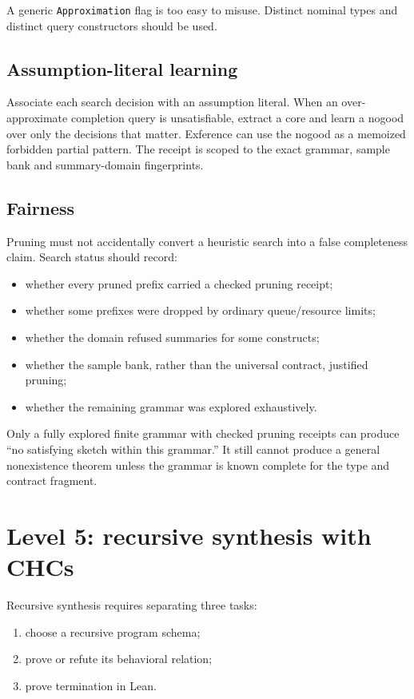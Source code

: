 \documentclass[11pt,oneside]{report}
\newcommand{\code}[1]{\texttt{#1}}
\begin{document}
A generic \code{Approximation} flag is too easy to misuse. Distinct nominal types and distinct query constructors should be used.

\subsection{Assumption-literal learning}

Associate each search decision with an assumption literal. When an over-approximate completion query is unsatisfiable, extract a core and learn a nogood over only the decisions that matter. Exference can use the nogood as a memoized forbidden partial pattern. The receipt is scoped to the exact grammar, sample bank and summary-domain fingerprints.

\subsection{Fairness}

Pruning must not accidentally convert a heuristic search into a false completeness claim. Search status should record:

\begin{itemize}[leftmargin=2em]
\item whether every pruned prefix carried a checked pruning receipt;
\item whether some prefixes were dropped by ordinary queue/resource limits;
\item whether the domain refused summaries for some constructs;
\item whether the sample bank, rather than the universal contract, justified pruning;
\item whether the remaining grammar was explored exhaustively.
\end{itemize}

Only a fully explored finite grammar with checked pruning receipts can produce ``no satisfying sketch within this grammar.'' It still cannot produce a general nonexistence theorem unless the grammar is known complete for the type and contract fragment.

\section{Level 5: recursive synthesis with CHCs}
\label{sec:chc-synthesis}

Recursive synthesis requires separating three tasks:

\begin{enumerate}[leftmargin=2em]
\item choose a recursive program schema;
\item prove or refute its behavioral relation;
\item prove termination in Lean.
\end{enumerate}
\end{document}
